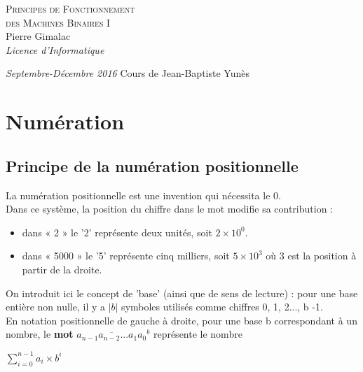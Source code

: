 \documentclass[a4paper,10pt]{book}
\begin{document}
\begin{titlepage}
\thispagestyle{empty}
\begin{center}
\vspace*{6.7cm}
\Huge \textsc{Principes de Fonctionnement\\
des Machines Binaires I}\\
\vspace{1.5cm}
\Large Pierre Gimalac\\
\vspace{0.5cm}
\large \textit{Licence d'Informatique}
\vfill
\end{center}
\large \textit{Septembre-Décembre 2016}
\hfill 
\large Cours de Jean-Baptiste Yunès
\restoregeometry
\end{titlepage}

\renewcommand{\contentsname}{Sommaire}
\thispagestyle{empty}
\tableofcontents \thispagestyle{empty}

\chapter{Numération}
\section{Principe de la numération positionnelle}
La numération positionnelle est une invention qui nécessita le 0.\\

Dans ce système, la position du chiffre dans le mot modifie sa contribution :\\
\begin{itemize} \item dans « 2 » le '2' représente deux unités, soit $2\times 10^{0}$.
\item dans « 5000 » le '5' représente cinq milliers, soit $5\times 10^{3}$ où 3 est la position à partir de la droite.\\\end{itemize}

On introduit ici le concept de 'base' (ainsi que de sens de lecture) : pour une base entière non nulle, il y a $|b|$ symboles utilisés comme chiffres 0, 1, 2..., b -1.\\

En notation positionnelle de gauche à droite, pour une base b correspondant à un nombre, le \textbf{mot}
$\overline{a_{n-1}a_{n-2}...a_{1}a_{0}}^{b}$ représente le nombre
\begin{center} $\sum\limits_{i=0}^{n-1} a_{i}\times b^{i}$ \end{center}
\end{document}
